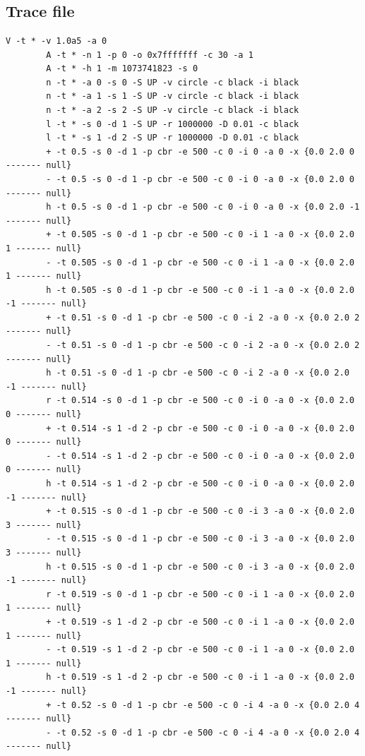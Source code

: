 \documentclass[12pt]{article}
\begin{document}
	\section{}
	\subsection{Trace file}
	
	\begin{lstlisting}[]
		V -t * -v 1.0a5 -a 0
		A -t * -n 1 -p 0 -o 0x7fffffff -c 30 -a 1
		A -t * -h 1 -m 1073741823 -s 0
		n -t * -a 0 -s 0 -S UP -v circle -c black -i black
		n -t * -a 1 -s 1 -S UP -v circle -c black -i black
		n -t * -a 2 -s 2 -S UP -v circle -c black -i black
		l -t * -s 0 -d 1 -S UP -r 1000000 -D 0.01 -c black
		l -t * -s 1 -d 2 -S UP -r 1000000 -D 0.01 -c black
		+ -t 0.5 -s 0 -d 1 -p cbr -e 500 -c 0 -i 0 -a 0 -x {0.0 2.0 0 ------- null}
		- -t 0.5 -s 0 -d 1 -p cbr -e 500 -c 0 -i 0 -a 0 -x {0.0 2.0 0 ------- null}
		h -t 0.5 -s 0 -d 1 -p cbr -e 500 -c 0 -i 0 -a 0 -x {0.0 2.0 -1 ------- null}
		+ -t 0.505 -s 0 -d 1 -p cbr -e 500 -c 0 -i 1 -a 0 -x {0.0 2.0 1 ------- null}
		- -t 0.505 -s 0 -d 1 -p cbr -e 500 -c 0 -i 1 -a 0 -x {0.0 2.0 1 ------- null}
		h -t 0.505 -s 0 -d 1 -p cbr -e 500 -c 0 -i 1 -a 0 -x {0.0 2.0 -1 ------- null}
		+ -t 0.51 -s 0 -d 1 -p cbr -e 500 -c 0 -i 2 -a 0 -x {0.0 2.0 2 ------- null}
		- -t 0.51 -s 0 -d 1 -p cbr -e 500 -c 0 -i 2 -a 0 -x {0.0 2.0 2 ------- null}
		h -t 0.51 -s 0 -d 1 -p cbr -e 500 -c 0 -i 2 -a 0 -x {0.0 2.0 -1 ------- null}
		r -t 0.514 -s 0 -d 1 -p cbr -e 500 -c 0 -i 0 -a 0 -x {0.0 2.0 0 ------- null}
		+ -t 0.514 -s 1 -d 2 -p cbr -e 500 -c 0 -i 0 -a 0 -x {0.0 2.0 0 ------- null}
		- -t 0.514 -s 1 -d 2 -p cbr -e 500 -c 0 -i 0 -a 0 -x {0.0 2.0 0 ------- null}
		h -t 0.514 -s 1 -d 2 -p cbr -e 500 -c 0 -i 0 -a 0 -x {0.0 2.0 -1 ------- null}
		+ -t 0.515 -s 0 -d 1 -p cbr -e 500 -c 0 -i 3 -a 0 -x {0.0 2.0 3 ------- null}
		- -t 0.515 -s 0 -d 1 -p cbr -e 500 -c 0 -i 3 -a 0 -x {0.0 2.0 3 ------- null}
		h -t 0.515 -s 0 -d 1 -p cbr -e 500 -c 0 -i 3 -a 0 -x {0.0 2.0 -1 ------- null}
		r -t 0.519 -s 0 -d 1 -p cbr -e 500 -c 0 -i 1 -a 0 -x {0.0 2.0 1 ------- null}
		+ -t 0.519 -s 1 -d 2 -p cbr -e 500 -c 0 -i 1 -a 0 -x {0.0 2.0 1 ------- null}
		- -t 0.519 -s 1 -d 2 -p cbr -e 500 -c 0 -i 1 -a 0 -x {0.0 2.0 1 ------- null}
		h -t 0.519 -s 1 -d 2 -p cbr -e 500 -c 0 -i 1 -a 0 -x {0.0 2.0 -1 ------- null}
		+ -t 0.52 -s 0 -d 1 -p cbr -e 500 -c 0 -i 4 -a 0 -x {0.0 2.0 4 ------- null}
		- -t 0.52 -s 0 -d 1 -p cbr -e 500 -c 0 -i 4 -a 0 -x {0.0 2.0 4 ------- null}
	\end{lstlisting}
	
\end{document}

